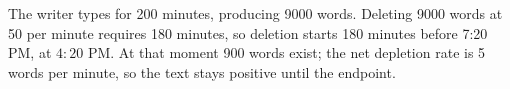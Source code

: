 The writer types for 200 minutes, producing 9000 words. Deleting 9000 words at 50 per minute requires 180 minutes, so deletion starts 180 minutes before 7:20 PM, at $\boxed{4{:}20\text{ PM}}$. At that moment 900 words exist; the net depletion rate is 5 words per minute, so the text stays positive until the endpoint.
